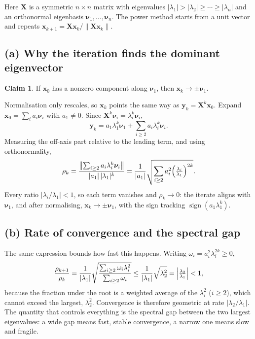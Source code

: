 \documentclass[12pt,a4paper]{article}
\theoremstyle{definition}
\newtheorem*{claimx}{Claim}
\newcommand{\norm}[1]{\lVert #1 \rVert}
\begin{document}
Here $\mathbf X$ is a symmetric $n\times n$ matrix with eigenvalues
$|\lambda_1|>|\lambda_2|\ge\cdots\ge|\lambda_n|$ and an orthonormal eigenbasis
$\bm\nu_1,\dots,\bm\nu_n$. The power method starts from a unit vector and repeats
$\bm x_{k+1}=\mathbf X\bm x_k/\norm{\mathbf X\bm x_k}$.

\subsection{(a) Why the iteration finds the dominant eigenvector}
\begin{claimx} If $\bm x_0$ has a nonzero component along $\bm\nu_1$, then $\bm x_k\to\pm\bm\nu_1$. \end{claimx}
Normalisation only rescales, so $\bm x_k$ points the same way as $\bm y_k=\mathbf X^{k}\bm x_0$.
Expand $\bm x_0=\sum_i a_i\bm\nu_i$ with $a_1\neq0$. Since $\mathbf X^{k}\bm\nu_i=\lambda_i^{k}\bm\nu_i$,
\begin{equation}
  \bm y_k=a_1\lambda_1^{k}\bm\nu_1+\sum_{i\ge2}a_i\lambda_i^{k}\bm\nu_i .
\end{equation}
Measuring the off-axis part relative to the leading term, and using orthonormality,
\begin{equation}
  \rho_k=\frac{\bigl\lVert\sum_{i\ge2}a_i\lambda_i^{k}\bm\nu_i\bigr\rVert}{|a_1|\,|\lambda_1|^{k}}
  =\frac{1}{|a_1|}\sqrt{\sum_{i\ge2}a_i^{2}\Bigl(\tfrac{\lambda_i}{\lambda_1}\Bigr)^{2k}} .
\end{equation}
Every ratio $|\lambda_i/\lambda_1|<1$, so each term vanishes and $\rho_k\to0$: the iterate aligns
with $\bm\nu_1$, and after normalising, $\bm x_k\to\pm\bm\nu_1$, with the sign tracking
$\operatorname{sign}(a_1\lambda_1^{k})$.

\subsection{(b) Rate of convergence and the spectral gap}
The same expression bounds how fast this happens. Writing $\omega_i=a_i^{2}\lambda_i^{2k}\ge0$,
\begin{equation}
  \frac{\rho_{k+1}}{\rho_k}=\frac{1}{|\lambda_1|}\sqrt{\frac{\sum_{i\ge2}\omega_i\lambda_i^{2}}{\sum_{i\ge2}\omega_i}}
  \le\frac{1}{|\lambda_1|}\sqrt{\lambda_2^{2}}=\Bigl|\tfrac{\lambda_2}{\lambda_1}\Bigr|<1,
\end{equation}
because the fraction under the root is a weighted average of the $\lambda_i^{2}$ ($i\ge2$), which
cannot exceed the largest, $\lambda_2^{2}$. Convergence is therefore geometric at rate
$|\lambda_2/\lambda_1|$. The quantity that controls everything is the spectral gap between the two
largest eigenvalues: a wide gap means fast, stable convergence, a narrow one means slow and
fragile.
\end{document}
